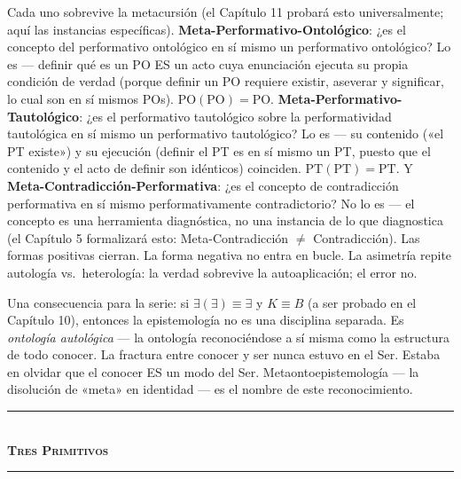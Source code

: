 \documentclass[10pt, openany, oneside]{book}
\renewcommand{\normalsize}{\fontsize{10}{13}\selectfont}
\begin{document}
Cada uno sobrevive la metacursión (el Capítulo 11 probará esto universalmente; aquí las instancias específicas). \textbf{Meta-Performativo-Ontológico}: ¿es el concepto del performativo ontológico en sí mismo un performativo ontológico? Lo es --- definir qué es un PO ES un acto cuya enunciación ejecuta su propia condición de verdad (porque definir un PO requiere existir, aseverar y significar, lo cual son en sí mismos POs). $\text{PO}(\text{PO}) = \text{PO}$. \textbf{Meta-Performativo-Tautológico}: ¿es el performativo tautológico sobre la performatividad tautológica en sí mismo un performativo tautológico? Lo es --- su contenido («el PT existe») y su ejecución (definir el PT es en sí mismo un PT, puesto que el contenido y el acto de definir son idénticos) coinciden. $\text{PT}(\text{PT}) = \text{PT}$. Y \textbf{Meta-Contradicción-Performativa}: ¿es el concepto de contradicción performativa en sí mismo performativamente contradictorio? No lo es --- el concepto es una herramienta diagnóstica, no una instancia de lo que diagnostica (el Capítulo 5 formalizará esto: Meta-Contradicción $\neq$ Contradicción). Las formas positivas cierran. La forma negativa no entra en bucle. La asimetría repite autología vs.\ heterología: la verdad sobrevive la autoaplicación; el error no.

Una consecuencia para la serie: si $\exists(\exists) \equiv \exists$ y $K \equiv B$ (a ser probado en el Capítulo 10), entonces la epistemología no es una disciplina separada. Es \textit{ontología autológica} --- la ontología reconociéndose a sí misma como la estructura de todo conocer. La fractura entre conocer y ser nunca estuvo en el Ser. Estaba en olvidar que el conocer ES un modo del Ser. Metaontoepistemología --- la disolución de «meta» en identidad --- es el nombre de este reconocimiento.

\vspace{1.5em}


\begin{center}
    \rule{0.3\textwidth}{0.4pt}\\[0.5em]
    {\normalsize\bfseries\scshape Tres Primitivos}\\[0.3em]
    \rule{0.3\textwidth}{0.4pt}
\end{center}

\vspace{1em}
\end{document}
